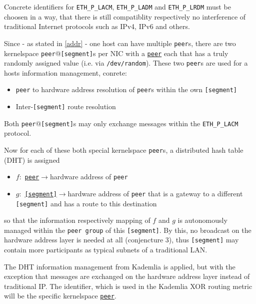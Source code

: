 \documentclass[times,10pt,twocolumn]{article}
\begin{document}
Concrete identifiers for \texttt{ETH\_P\_LACM}, \texttt{ETH\_P\_LADM} and
\texttt{ETH\_P\_LRDM} must be choosen in a way, that there is still compatiblity
respectively no interference of traditional Internet protocols such as IPv4, 
IPv6 and others.

Since - as stated in \ref{addr} - one host can have multiple \texttt{peer}s, 
there are two kernelspace \texttt{peer}@\texttt{[segment]}s per NIC with a 
\underline{\texttt{peer}} each that has a truly randomly assigned value 
(i.e. via \texttt{/dev/random}). These two \texttt{peer}s are used for a hosts 
information management, conrete:
\begin{itemize}
	\setlength{\itemsep}{-1mm}
	\item \texttt{peer} to hardware address resolution of
              \texttt{peer}s within the own \texttt{[segment]}
	\item Inter-\texttt{[segment]} route resolution
\end{itemize}

Both \texttt{peer}@\texttt{[segment]}s may only exchange messages within the
\texttt{ETH\_P\_LACM} protocol.\newline

Now for each of these both special kernelspace \texttt{peer}s, a distributed
hash table (DHT) is assigned
\begin{itemize}
	\setlength{\itemsep}{-1mm}
	\item $f:$ \underline{\texttt{peer}}$\rightarrow$hardware 
              address of \texttt{peer}
	\item $g:$ \underline{\texttt{[segment]}}$\rightarrow$hardware 
              address of \texttt{peer} that is a gateway to a different 
              \texttt{[segment]} and has a route to this destination
\end{itemize}
so that the information respectively mapping of $f$ and $g$ is autonomously 
managed within the \texttt{peer group} of this \texttt{[segment]}. By this,
no broadcast on the hardware address layer is needed at all (conjencture 3),
thus \texttt{[segment]} may contain more participants as typical subnets of 
a traditional LAN.\newline

The DHT information management from Kademlia \cite{PeterMaymounkovDavidMazieres} 
is applied, but with the exception that messages are exchanged on the hardware
address layer instead of traditional IP. The identifier, which is used in the
Kademlia XOR routing metric will be the specific kernelspace 
\underline{\texttt{peer}}.\newline
\end{document}
